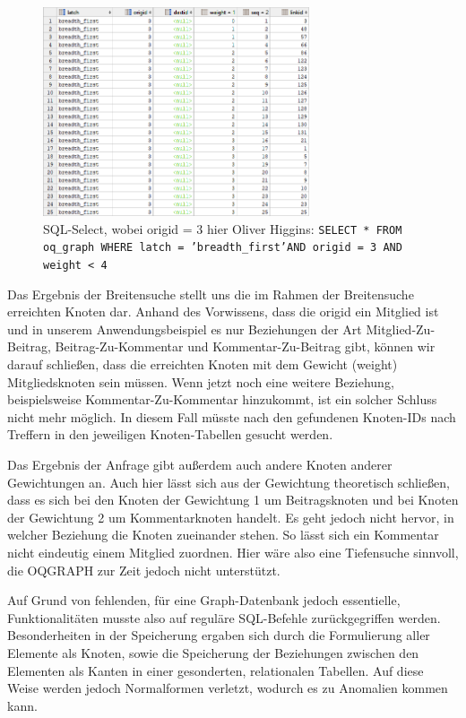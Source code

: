 \begin{figure}[h]
	\centering
	\includegraphics[width=0.7\textwidth]{images/oqgraph-select.png}
	\caption{SQL-Select, wobei origid = 3 hier Oliver Higgins: \newline
		\texttt{SELECT * FROM oq\_graph WHERE latch = 'breadth\_first'\newline AND origid = 3 AND weight < 4}
	}
\end{figure}

Das Ergebnis der Breitensuche stellt uns die im Rahmen der Breitensuche erreichten Knoten dar. Anhand des Vorwissens, dass die origid ein Mitglied ist und in unserem Anwendungsbeispiel es nur Beziehungen der Art Mitglied-Zu-Beitrag, Beitrag-Zu-Kommentar und Kommentar-Zu-Beitrag gibt, können wir darauf schließen, dass die erreichten Knoten mit dem Gewicht (weight) Mitgliedsknoten sein müssen. Wenn jetzt noch eine weitere Beziehung, beispielsweise \grqq Kommentar-Zu-Kommentar\grqq{} hinzukommt, ist ein solcher Schluss nicht mehr möglich. In diesem Fall müsste nach den gefundenen Knoten-IDs nach Treffern in den jeweiligen Knoten-Tabellen gesucht werden.

Das Ergebnis der Anfrage gibt außerdem auch andere Knoten anderer Gewichtungen an. Auch hier lässt sich aus der Gewichtung theoretisch schließen, dass es sich bei den Knoten der Gewichtung 1 um Beitragsknoten und bei Knoten der Gewichtung 2 um Kommentarknoten handelt. Es geht jedoch nicht hervor, in welcher Beziehung die Knoten zueinander stehen. So lässt sich ein Kommentar nicht eindeutig einem Mitglied zuordnen. Hier wäre also eine Tiefensuche sinnvoll, die OQGRAPH zur Zeit jedoch nicht unterstützt.

Auf Grund von fehlenden, für eine Graph-Datenbank jedoch essentielle, Funktionalitäten musste also auf reguläre SQL-Befehle zurückgegriffen werden. Besonderheiten in der Speicherung ergaben sich durch die Formulierung aller Elemente als Knoten, sowie die Speicherung der Beziehungen zwischen den Elementen als Kanten in einer gesonderten, relationalen Tabellen. Auf diese Weise werden jedoch Normalformen verletzt, wodurch es zu Anomalien kommen kann.

